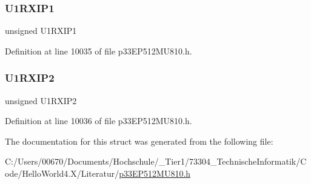 \subsubsection{\texorpdfstring{U1\+R\+X\+I\+P1}{U1RXIP1}}
{\footnotesize\ttfamily unsigned U1\+R\+X\+I\+P1}



Definition at line 10035 of file p33\+E\+P512\+M\+U810.\+h.

\mbox{\label{structtag_i_p_c2_b_i_t_s_a13b6fb969d7a0d3e87367d7d28339e18}} 
\subsubsection{\texorpdfstring{U1\+R\+X\+I\+P2}{U1RXIP2}}
{\footnotesize\ttfamily unsigned U1\+R\+X\+I\+P2}



Definition at line 10036 of file p33\+E\+P512\+M\+U810.\+h.



The documentation for this struct was generated from the following file\+:\begin{DoxyCompactItemize}
\item 
C\+:/\+Users/00670/\+Documents/\+Hochschule/\+\_\+\+Tier1/73304\+\_\+\+Technische\+Informatik/\+Code/\+Hello\+World4.\+X/\+Literatur/\hyperlink{p33_e_p512_m_u810_8h}{p33\+E\+P512\+M\+U810.\+h}\end{DoxyCompactItemize}
